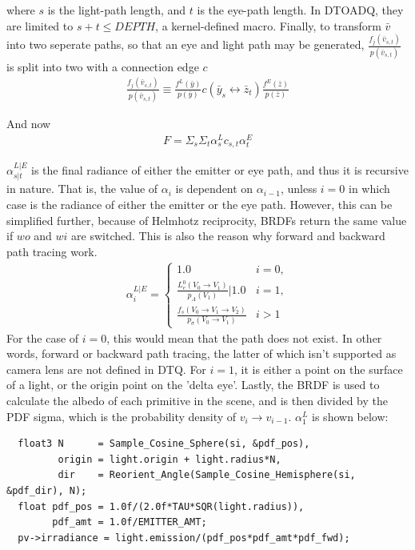 \documentclass{article}
\begin{document}
    where $s$ is the light-path length, and $t$ is the eye-path length. In
    DTOADQ, they are limited to $s+t \leq DEPTH$, a kernel-defined macro.
Finally, to transform $\bar{v}$ into two seperate paths, so that an eye and
light path may be generated, $\frac{f_j(\bar{v}_{s, t})}{p(\bar{v}_{s, t})}$ is
split into two with a connection edge $c$
  \begin{align}
    \frac{f_j(\bar{v}_{s, t})}{p(\bar{v}_{s, t})} \equiv
    \frac{f^L(\bar{y})}{p(\bar{y})} c(\bar{y}_s \leftrightarrow \bar{z}_t)
    \frac{f^E(\bar{z})}{p(\bar{z})}  
  \end{align}

    And now
  \begin{align}
    F = \Sigma_s\Sigma_t \alpha^L_s c_{s, t} \alpha^E_t
  \end{align}

  $\alpha_{s|t}^{L|E}$ is the final radiance of either the emitter or eye path,
  and thus it is recursive in nature. That is, the value of $\alpha_i$ is
  dependent on $\alpha_{i-1}$, unless $i = 0$ in which case is the radiance of
  either the emitter or the eye path. However, this can be simplified further,
because of Helmhotz reciprocity, BRDFs return the same value if $wo$ and $wi$
are switched. This is also the reason why forward and backward path tracing
work.
  \begin{align}
    \alpha^{L|E}_i =
    \begin{cases}
      1.0 &i = 0,\\
      \frac{
      L_e^0(V_0 \rightarrow V_1)}{p_A(V_1)} | 1.0 &i = 1,\\
      \frac{f_s(V_0 \rightarrow V_1 \rightarrow V_2)}{p_{\sigma}(V_0
      \rightarrow V_1)} &i > 1
    \end{cases}
  \end{align}
    For the case of $i = 0$, this would mean that the path does not exist. In
other words, forward or backward path tracing, the latter of which isn't
supported as camera lens are not defined in DTQ. For $i = 1$, it is either a
point on the surface of a light, or the origin point on the 'delta eye'. Lastly,
the BRDF is used to calculate the albedo of each primitive in the scene, and is
then divided by the PDF sigma, which is the probability density of $v_i
\rightarrow v_{i-1}$. $\alpha_1^L$ is shown below:

\begin{lstlisting}
  float3 N      = Sample_Cosine_Sphere(si, &pdf_pos),
         origin = light.origin + light.radius*N,
         dir    = Reorient_Angle(Sample_Cosine_Hemisphere(si, &pdf_dir), N);
  float pdf_pos = 1.0f/(2.0f*TAU*SQR(light.radius)),
        pdf_amt = 1.0f/EMITTER_AMT;
  pv->irradiance = light.emission/(pdf_pos*pdf_amt*pdf_fwd);
\end{lstlisting}
\end{document}
